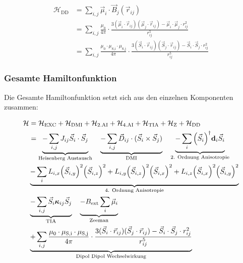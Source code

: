 \documentclass[main.tex]{subfiles}
\begin{document}

\begin{align}
	\mathcal{H}_{\text{DD}} 
	& = \sum_{i,j} \vec{\mu}_i \cdot \vec{B}_j(\vec{r}_{ij}) \nonumber \\
	& = \sum_{i,j} \frac{\mu_0}{4\pi}
	\cdot \frac{3(\vec{\mu}_i \cdot \vec{r}_{ij})(\vec{\mu}_j \cdot \vec{r}_{ij})
	- \vec{\mu}_i \cdot \vec{\mu}_j \cdot r_{ij}^2}{r_{ij}^5} \nonumber \\
	& = \sum_{i,j} \frac{\mu_0 \cdot \mu_{\text{S,i}} \cdot \mu_{\text{S,j}}}{4\pi}
	\cdot \frac{3(\vec{S}_i \cdot \vec{r}_{ij})(\vec{S}_j \cdot \vec{r}_{ij})
	- \vec{S}_i \cdot \vec{S}_j \cdot r_{ij}^2}{r_{ij}^5}\label{eq:hamilton-dd}
\end{align}

\subsubsection*{Gesamte Hamiltonfunktion}

Die Gesamte Hamiltonfunktion setzt sich aus den einzelnen Komponenten zusammen:

\begin{align}
	\mathcal{H} & = \mathcal{H}_{\text{EXC}} + \mathcal{H}_{\text{DMI}} +
	\mathcal{H}_{\text{2.AI}} + \mathcal{H}_{\text{4.AI}} +
	\mathcal{H}_{\text{TIA}} + \mathcal{H}_{\text{Z}} +
	\mathcal{H}_{\text{DD}}\label{eq:hamilton}\nonumber \\
	& = \underbrace{-\sum_{i,j} J_{ij} \vec{S}_i \cdot \vec{S}_j}_\text{Heisenberg Austausch} %
	\quad \underbrace{-\sum_{i,j} \vec{D}_{ij} \cdot (\vec{S}_i \times \vec{S}_j)}_\text{DMI} %
	\quad \underbrace{-\sum_{i} \qty(\vec{S}_i)^\dagger \mat{d}_i \vec{S}_i}_\text{2. Ordnung Anisotropie}\nonumber  \\ %
	& \underbrace{-\sum_{i} L_{i,x} \qty(\vec{S}_{i,y})^2 \qty(\vec{S}_{i,z})^2 + L_{i,y} \qty(\vec{S}_{i,z})^2 \qty(\vec{S}_{i,x})^2 + L_{i,z} \qty(\vec{S}_{i,x})^2 \qty(\vec{S}_{i,y})^2}_\text{4. Ordnung Anisotropie} \nonumber\\ %
	& \underbrace{-\sum_{i,j} \vec{S}_i \mat{\kappa}_{ij} \vec{S}_j}_\text{TIA}%
	\quad \underbrace{- B_\text{ext} \sum_{i} \vec{\mu}_i}_\text{Zeeman} \nonumber\\ %
	& \underbrace{ + \sum_{i,j} \frac{\mu_0 \cdot \mu_{\text{S,i}} \cdot \mu_{\text{S,j}}}{4\pi} \cdot \frac{3(\vec{S}_i \cdot \vec{r}_{ij})(\vec{S}_j \cdot \vec{r}_{ij}) - \vec{S}_i \cdot \vec{S}_j \cdot r_{ij}^2}{r_{ij}^5}}_\text{Dipol Dipol Wechselwirkung} %
\end{align}
\end{document}
